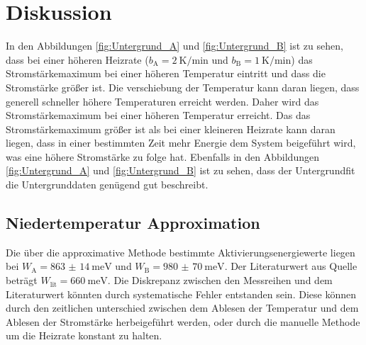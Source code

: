 \section{Diskussion}
\label{sec:Diskussion}
In den Abbildungen \ref{fig:Untergrund_A} und \ref{fig:Untergrund_B} ist zu sehen, dass bei einer höheren Heizrate ($b_{\text{A}}=
\SI{2}{\kelvin\per\minute}$ und $b_{\text{B}}=\SI{1}{\kelvin\per\minute}$) das Stromstärkemaximum bei einer höheren Temperatur 
eintritt und dass die Stromstärke größer ist. Die verschiebung der Temperatur kann daran liegen, dass generell schneller höhere
Temperaturen erreicht werden. Daher wird das Stromstärkemaximum bei einer höheren Temperatur erreicht. Das das Stromstärkemaximum
größer ist als bei einer kleineren Heizrate kann daran liegen, dass in einer bestimmten Zeit mehr Energie dem System beigeführt wird,
was eine höhere Stromstärke zu folge hat. Ebenfalls in den Abbildungen \ref{fig:Untergrund_A} und \ref{fig:Untergrund_B} ist zu sehen,
dass der Untergrundfit die Untergrunddaten genügend gut beschreibt.
\subsection{Niedertemperatur Approximation}
Die über die approximative Methode bestimmte Aktivierungsenergiewerte liegen bei $W_{\text{A}}=\SI{863(14)}{\milli\eV}$ und
$W_{\text{B}}=\SI{980(70)}{\milli\eV}$. Der Literaturwert aus Quelle \cite{Muccillo} beträgt $W_{\text{lit}}=\SI{660}{\milli\eV}$.
Die Diskrepanz zwischen den Messreihen und dem Literaturwert könnten durch systematische Fehler entstanden sein. Diese können 
durch den zeitlichen unterschied zwischen dem Ablesen der Temperatur und dem Ablesen der Stromstärke herbeigeführt werden, oder 
durch die manuelle Methode um die Heizrate konstant zu halten. 

